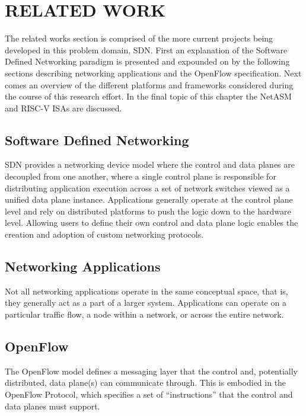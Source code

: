 \chapter{RELATED WORK}
\label{related}
The related works section is comprised of the more current projects being
developed in this problem domain, SDN. First an explanation of the Software
Defined Networking paradigm is presented and expounded on by the following
sections describing networking applications and the OpenFlow \cite{openflow}
specification. Next comes an overview of the different platforms and frameworks
considered during the course of this research effort. In the final topic of
this chapter the NetASM and RISC-V ISAs are discussed.

\section{Software Defined Networking}
\label{related:sdn}
SDN provides a networking device model where the control and data planes are
decoupled from one another, where a single control plane is responsible for
distributing application execution across a set of network switches viewed as
a unified data plane instance. Applications generally operate at the control
plane level and rely on distributed platforms to push the logic down to the hardware level. Allowing users to define their own control and data plane
logic enables the creation and adoption of custom networking protocols.


\section{Networking Applications}
\label{related:apps}
Not all networking applications operate in the same conceptual space, that is,
they generally act as a part of a larger system. Applications can operate on a
particular traffic flow, a node within a network, or across the entire network.


\section{OpenFlow}
\label{related:of}
The OpenFlow \cite{openflow} model defines a messaging layer that the control
and, potentially distributed, data plane(s) can communicate through. This is
embodied in the OpenFlow Protocol, which specifies a set of ``instructions''
that the control and data planes must support.

